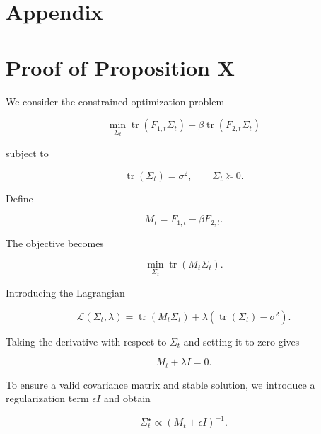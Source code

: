 \documentclass{article}
\begin{document}

\section{Appendix}

\section{Proof of Proposition X}

We consider the constrained optimization problem

\begin{equation}
\min_{\Sigma_t}
\operatorname{tr}(F_{1,t}\Sigma_t)
-
\beta
\operatorname{tr}(F_{2,t}\Sigma_t)
\end{equation}

subject to

\begin{equation}
\operatorname{tr}(\Sigma_t)=\sigma^2,
\qquad
\Sigma_t \succeq 0 .
\end{equation}

Define

\begin{equation}
M_t = F_{1,t}-\beta F_{2,t}.
\end{equation}

The objective becomes

\begin{equation}
\min_{\Sigma_t} \operatorname{tr}(M_t \Sigma_t).
\end{equation}

Introducing the Lagrangian

\begin{equation}
\mathcal{L}(\Sigma_t,\lambda)
=
\operatorname{tr}(M_t \Sigma_t)
+
\lambda(\operatorname{tr}(\Sigma_t)-\sigma^2).
\end{equation}

Taking the derivative with respect to $\Sigma_t$ and setting it to zero gives

\begin{equation}
M_t + \lambda I = 0.
\end{equation}

To ensure a valid covariance matrix and stable solution, we introduce a regularization term $\epsilon I$ and obtain

\begin{equation}
\Sigma_t^\star
\propto
(M_t + \epsilon I)^{-1}.
\end{equation}
\end{document}
